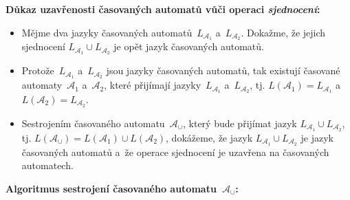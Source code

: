 \documentclass[a4paper, 11pt]{scrartcl}
\begin{document}
    \textbf{Důkaz uzavřenosti časovaných automatů vůči operaci
    \emph{sjednocení}:}
    \begin{itemize}
        \item
            Mějme dva jazyky časovaných automatů~$ L_{\mathcal{A}_1} $
            a~$ L_{\mathcal{A}_2} $. Dokažme, že jejich sjednocení
            $ L_{\mathcal{A}_1} \cup L_{\mathcal{A}_2} $ je opět jazyk
            časovaných automatů.

        \item
            Protože~$ L_{\mathcal{A}_1} $ a~$ L_{\mathcal{A}_2} $ jsou
            jazyky časovaných automatů, tak existují časované
            automaty~$ \mathcal{A}_1 $ a~$ \mathcal{A}_2 $, které přijímají
            jazyky~$ L_{\mathcal{A}_1} $ a~$ L_{\mathcal{A}_2} $, tj.
            $ L(\mathcal{A}_1) = L_{\mathcal{A}_1} $ a~$ L(\mathcal{A}_2) =
            L_{\mathcal{A}_2} $.

        \item
            Sestrojením časovaného automatu~$ \mathcal{A}_\cup $, který bude
            přijímat jazyk $ L_{\mathcal{A}_1} \cup L_{\mathcal{A}_2} $, tj.
            $ L(\mathcal{A}_\cup) = L(\mathcal{A}_1) \cup L(\mathcal{A}_2) $,
            dokážeme, že jazyk $ L_{\mathcal{A}_1} \cup L_{\mathcal{A}_2} $
            je jazyk časovaných automatů a~že operace sjednocení je uzavřena
            na časovaných automatech.
    \end{itemize}
    \vspace{-5pt}
    \textbf{Algoritmus sestrojení časovaného automatu~$ \boldsymbol{\mathcal{
    A}_\cup} $:}
\end{document}
